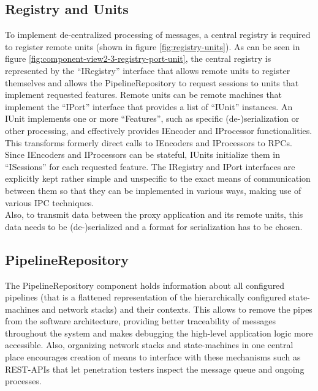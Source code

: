 \subsection{Registry and Units} To implement de-centralized processing of messages, a central registry is required to register remote units (shown in figure \ref{fig:registry-units}).
As can be seen in figure \ref{fig:component-view2-3-registry-port-unit}, the central registry is represented by the \enquote{IRegistry} interface that allows remote units to register themselves and allows the PipelineRepository to request sessions to units that implement requested features. Remote units can be remote machines that implement the \enquote{IPort} interface that provides a list of \enquote{IUnit} instances. An IUnit implements one or more \enquote{Features}, such as specific (de-)serialization or other processing, and effectively provides IEncoder and IProcessor functionalities. This transforms formerly direct calls to IEncoders and IProcessors to \acp{RPC}. Since IEncoders and IProcessors can be stateful, IUnits initialize them in \enquote{ISessions} for each requested feature. The IRegistry and IPort interfaces are explicitly kept rather simple and unspecific to the exact means of communication between them so that they can be implemented in various ways, making use of various \ac{IPC} techniques.\\
Also, to transmit data between the proxy application and its remote units, this data needs to be (de-)serialized and a format for serialization has to be chosen.

\subsection{PipelineRepository} The PipelineRepository component holds information about all configured pipelines (that is a flattened representation of the hierarchically configured state-machines and network stacks) and their contexts. This allows to remove the pipes from the software architecture, providing better traceability of messages throughout the system and makes debugging the high-level application logic more accessible. Also, organizing network stacks and state-machines in one central place encourages creation of means to interface with these mechanisms such as \ac{REST}-\acp{API} that let penetration testers inspect the message queue and ongoing processes.

